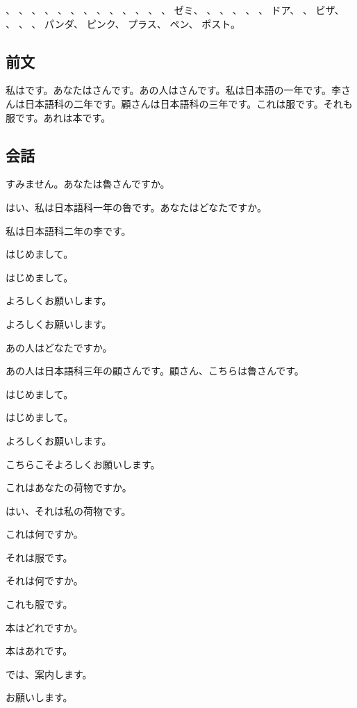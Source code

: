\documentclass[a5j]{ltjtarticle}
\newcommand*{\Rospeaks}{\item[魯]}
\newcommand*{\Lispeaks}{\item[李]}
\newcommand*{\Kospeaks}{\item[顧]}
\begin{document}
\begin{onehalfspace}
  、
  、
  、
  、
  、
  、
  、
  、
  、
  、
  、
  、
  、
  ゼミ、
  、
  、
  、
  、
  、
  ドア、
  、
  ビザ、
  、
  、
  、
  パンダ、
  ピンク、
  プラス、
  ペン、
  ポスト。
\end{onehalfspace}

\subsection*{前文}

私はです。あなたはさんです。あの人はさんです。私は日本語の一年です。李さんは日本語科の二年です。顧さんは日本語科の三年です。これは服です。それも服です。あれは本です。

\subsection*{会話}

\begin{dialogue}
  \Lispeaks すみません。あなたは魯さんですか。
  \Rospeaks はい、私は日本語科一年の魯です。あなたはどなたですか。
  \Lispeaks 私は日本語科二年の李です。
  \Rospeaks はじめまして。
  \Lispeaks はじめまして。
  \Rospeaks よろしくお願いします。
  \Lispeaks よろしくお願いします。
  \Rospeaks あの人はどなたですか。
  \Lispeaks あの人は日本語科三年の顧さんです。顧さん、こちらは魯さんです。
  \Kospeaks はじめまして。
  \Rospeaks はじめまして。
  \Kospeaks よろしくお願いします。
  \Rospeaks こちらこそよろしくお願いします。
  \item[]
  \Lispeaks これはあなたの荷物ですか。
  \Rospeaks はい、それは私の荷物です。
  \Lispeaks これは何ですか。
  \Rospeaks それは服です。
  \Lispeaks それは何ですか。
  \Rospeaks これも服です。
  \Lispeaks 本はどれですか。
  \Rospeaks 本はあれです。
  \Lispeaks では、案内します。
  \Rospeaks お願いします。
\end{dialogue}
\end{document}

